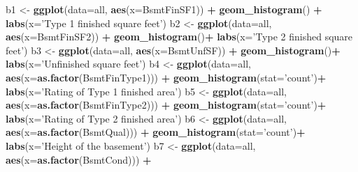 \documentclass[]{article}
\newenvironment{Shaded}{\begin{snugshade}}{\end{snugshade}}
\newcommand{\KeywordTok}[1]{\textcolor[rgb]{0.13,0.29,0.53}{\textbf{#1}}}
\newcommand{\DataTypeTok}[1]{\textcolor[rgb]{0.13,0.29,0.53}{#1}}
\newcommand{\StringTok}[1]{\textcolor[rgb]{0.31,0.60,0.02}{#1}}
\newcommand{\OperatorTok}[1]{\textcolor[rgb]{0.81,0.36,0.00}{\textbf{#1}}}
\newcommand{\NormalTok}[1]{#1}
\begin{document}
\begin{Shaded}
\begin{Highlighting}[]
\NormalTok{b1 <-}\StringTok{ }\KeywordTok{ggplot}\NormalTok{(}\DataTypeTok{data=}\NormalTok{all, }\KeywordTok{aes}\NormalTok{(}\DataTypeTok{x=}\NormalTok{BsmtFinSF1)) }\OperatorTok{+}
\StringTok{        }\KeywordTok{geom_histogram}\NormalTok{() }\OperatorTok{+}\StringTok{ }\KeywordTok{labs}\NormalTok{(}\DataTypeTok{x=}\StringTok{'Type 1 finished square feet'}\NormalTok{)}
\NormalTok{b2 <-}\StringTok{ }\KeywordTok{ggplot}\NormalTok{(}\DataTypeTok{data=}\NormalTok{all, }\KeywordTok{aes}\NormalTok{(}\DataTypeTok{x=}\NormalTok{BsmtFinSF2)) }\OperatorTok{+}
\StringTok{        }\KeywordTok{geom_histogram}\NormalTok{()}\OperatorTok{+}\StringTok{ }\KeywordTok{labs}\NormalTok{(}\DataTypeTok{x=}\StringTok{'Type 2 finished square feet'}\NormalTok{)}
\NormalTok{b3 <-}\StringTok{ }\KeywordTok{ggplot}\NormalTok{(}\DataTypeTok{data=}\NormalTok{all, }\KeywordTok{aes}\NormalTok{(}\DataTypeTok{x=}\NormalTok{BsmtUnfSF)) }\OperatorTok{+}
\StringTok{        }\KeywordTok{geom_histogram}\NormalTok{()}\OperatorTok{+}\StringTok{ }\KeywordTok{labs}\NormalTok{(}\DataTypeTok{x=}\StringTok{'Unfinished square feet'}\NormalTok{)}
\NormalTok{b4 <-}\StringTok{ }\KeywordTok{ggplot}\NormalTok{(}\DataTypeTok{data=}\NormalTok{all, }\KeywordTok{aes}\NormalTok{(}\DataTypeTok{x=}\KeywordTok{as.factor}\NormalTok{(BsmtFinType1))) }\OperatorTok{+}
\StringTok{        }\KeywordTok{geom_histogram}\NormalTok{(}\DataTypeTok{stat=}\StringTok{'count'}\NormalTok{)}\OperatorTok{+}\StringTok{ }\KeywordTok{labs}\NormalTok{(}\DataTypeTok{x=}\StringTok{'Rating of Type 1 finished area'}\NormalTok{)}
\NormalTok{b5 <-}\StringTok{ }\KeywordTok{ggplot}\NormalTok{(}\DataTypeTok{data=}\NormalTok{all, }\KeywordTok{aes}\NormalTok{(}\DataTypeTok{x=}\KeywordTok{as.factor}\NormalTok{(BsmtFinType2))) }\OperatorTok{+}
\StringTok{        }\KeywordTok{geom_histogram}\NormalTok{(}\DataTypeTok{stat=}\StringTok{'count'}\NormalTok{)}\OperatorTok{+}\StringTok{ }\KeywordTok{labs}\NormalTok{(}\DataTypeTok{x=}\StringTok{'Rating of Type 2 finished area'}\NormalTok{)}
\NormalTok{b6 <-}\StringTok{ }\KeywordTok{ggplot}\NormalTok{(}\DataTypeTok{data=}\NormalTok{all, }\KeywordTok{aes}\NormalTok{(}\DataTypeTok{x=}\KeywordTok{as.factor}\NormalTok{(BsmtQual))) }\OperatorTok{+}
\StringTok{        }\KeywordTok{geom_histogram}\NormalTok{(}\DataTypeTok{stat=}\StringTok{'count'}\NormalTok{)}\OperatorTok{+}\StringTok{ }\KeywordTok{labs}\NormalTok{(}\DataTypeTok{x=}\StringTok{'Height of the basement'}\NormalTok{)}
\NormalTok{b7 <-}\StringTok{ }\KeywordTok{ggplot}\NormalTok{(}\DataTypeTok{data=}\NormalTok{all, }\KeywordTok{aes}\NormalTok{(}\DataTypeTok{x=}\KeywordTok{as.factor}\NormalTok{(BsmtCond))) }\OperatorTok{+}

\end{Highlighting}
\end{Shaded}
\end{document}
